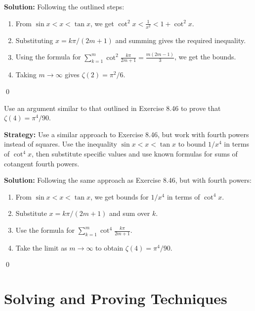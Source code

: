 \bigskip\noindent\textbf{Solution:}
Following the outlined steps:
\begin{enumerate}
\item From \(\sin x < x < \tan x\), we get \(\cot^2 x < \frac{1}{x^2} < 1 + \cot^2 x\).
\item Substituting \(x = k\pi/(2m + 1)\) and summing gives the required inequality.
\item Using the formula for \(\sum_{k=1}^m \cot^2 \frac{k\pi}{2m + 1} = \frac{m(2m-1)}{3}\), we get the bounds.
\item Taking \(m \to \infty\) gives \(\zeta(2) = \pi^2/6\).
\end{enumerate}\qed




\begin{problembox}
\begin{problemstatement}
Use an argument similar to that outlined in Exercise 8.46 to prove that \(\zeta(4) = \pi^4/90\).
\end{problemstatement}
\end{problembox}

\noindent\textbf{Strategy:} Use a similar approach to Exercise 8.46, but work with fourth powers instead of squares. Use the inequality \(\sin x < x < \tan x\) to bound \(1/x^4\) in terms of \(\cot^4 x\), then substitute specific values and use known formulas for sums of cotangent fourth powers.

\bigskip\noindent\textbf{Solution:}
Following the same approach as Exercise 8.46, but with fourth powers:
\begin{enumerate}
\item From \(\sin x < x < \tan x\), we get bounds for \(1/x^4\) in terms of \(\cot^4 x\).
\item Substitute \(x = k\pi/(2m + 1)\) and sum over \(k\).
\item Use the formula for \(\sum_{k=1}^m \cot^4 \frac{k\pi}{2m + 1}\).
\item Take the limit as \(m \to \infty\) to obtain \(\zeta(4) = \pi^4/90\).
\end{enumerate}
\qed

\section{Solving and Proving Techniques}

